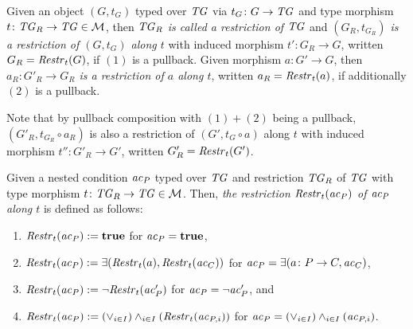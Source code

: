 \vspace{-2ex}
\begin{definition}
\label{def:sec-dc-general-res:res_alomg_mor}
Given an object $(G,t_G)$ typed over $\mathit{TG}$ via $t_G\colon G \to \mathit{TG}$ and type morphism $t\colon \mathit{TG}_R \to \mathit{TG} \in {\cal M}$, then \emph{$\mathit{TG}_R$ is called a restriction of $\mathit{TG}$} and \emph{$(G_R,t_{G_R})$ is a restriction of $(G,t_G)$ along $t$} with induced morphism $t'\colon G_R \to G$, written $G_R=\mathit{Restr}_t(G)$, if $(1)$ is a pullback.
Given morphism $a\colon G' \to G$, then \emph{$a_R\colon G'_R \to G_R$ is a restriction of $a$ along $t$}, written $a_R=\mathit{Restr}_t(a)$, if additionally $(2)$ is a pullback.
\envEndMarker
\end{definition}

\begin{remark}
\label{rem:sec-dc-general-res:res_obj}
Note that by pullback composition with $(1)+(2)$ being a pullback, $(G'_R,t_{G_R} \circ a_R)$ is also a restriction of $(G',t_G \circ a)$ along $t$ with induced morphism $t''\colon G'_R \to G'$, written $G'_R=\mathit{Restr}_t(G')$.
\envEndMarker
\end{remark}

\begin{definition}
\label{def:sec-dc-general-res:res_cond}
Given a nested condition $\mathit{ac}_P$ typed over $\mathit{TG}$ and restriction $\mathit{TG}_R$ of $\mathit{TG}$ with type morphism $t\colon \mathit{TG}_R \to \mathit{TG} \in {\cal M}$.
Then, \emph{the restriction $\mathit{Restr}_t(\mathit{ac}_P)$ of $\mathit{ac}_P$ along $t$} is defined as follows:
\begin{enumerate}
  \item $\mathit{Restr}_t(\mathit{ac}_P):=\textbf{true}$ for $\mathit{ac}_P=\textbf{true}$,
  \item $\mathit{Restr}_t(\mathit{ac}_P):=\exists(\mathit{Restr}_t(a), \mathit{Restr}_t(\mathit{ac}_C))$ for $\mathit{ac}_P=\exists(a\colon P \to C,\mathit{ac}_C)$,
  \item $\mathit{Restr}_t(\mathit{ac}_P):=\neg\mathit{Restr}_t(\mathit{ac}'_P)$ for $\mathit{ac}_P=\neg\mathit{ac}'_P$, and
  \item $\mathit{Restr}_t(\mathit{ac}_P):=(\vee_{i \in I})\wedge_{i \in I}(\mathit{Restr}_t(\mathit{ac}_{P,i}))$ for $\mathit{ac}_P=(\vee_{i \in I})\wedge_{i \in I}(\mathit{ac}_{P,i})$.
  \envEndMarker
\end{enumerate}
\end{definition}

